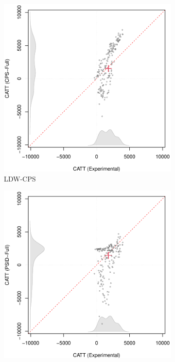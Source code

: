 \documentclass[letterpaper,12pt,leqno]{article}
\begin{document}
\begin{figure}[!ht]
    \caption{CATT Estimates using LDW Data: Experimental vs. Nonexperimental}\label{fig:catt}
    \centering
    \begin{minipage}[c]{1\textwidth}
        \centering
        \begin{subfigure}{0.45\linewidth}
            \includegraphics[width=\linewidth]{catt_cps.pdf}
            \caption{LDW-CPS}
        \end{subfigure}
        \begin{subfigure}{0.45\linewidth}
            \includegraphics[width=\linewidth]{catt_PSID.pdf}

\end{subfigure}
\end{minipage}
\end{figure}
\end{document}
